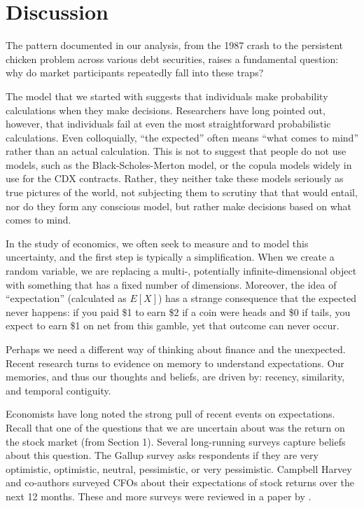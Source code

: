 
\section{Discussion}
The pattern documented in our analysis, from the 1987 crash to the persistent chicken problem across various debt securities, raises a fundamental question: why do market participants repeatedly fall into these traps?

The model that we started with suggests that individuals make probability calculations when they make decisions. Researchers have long pointed out, however, that individuals fail at even the most straightforward probabilistic calculations. Even colloquially, “the expected” often means “what comes to mind” rather than an actual calculation. This is not to suggest that people do not use models, such as the Black-Scholes-Merton model, or the copula models widely in use for the CDX contracts. Rather, they neither take these models seriously as true pictures of the world, not subjecting them to scrutiny that that would entail, nor do they form any conscious model, but rather make decisions based on what comes to mind. 

In the study of economics, we often seek to measure and to model this uncertainty, and the first step is typically a simplification. When we create a random variable, we are replacing a multi-, potentially infinite-dimensional object with something that has a fixed number of dimensions. Moreover, the idea of “expectation” (calculated as $E[X]$) has a strange consequence that the expected never happens: if you paid \$1 to earn \$2 if a coin were heads and \$0 if tails, you expect to earn \$1 on net from this gamble, yet that outcome can never occur. 

Perhaps we need a different way of thinking about finance and the unexpected. Recent research turns to evidence on memory to understand expectations. Our memories, and thus our thoughts and beliefs, are driven by: recency, similarity, and temporal contiguity.

Economists have long noted the strong pull of recent events on expectations. Recall that one of the questions that we are uncertain about was the return on the stock market (from Section 1). Several long-running surveys capture beliefs about this question. The Gallup survey asks respondents if they are very optimistic, optimistic, neutral, pessimistic, or very pessimistic. Campbell Harvey and co-authors surveyed CFOs about their expectations of stock returns over the next 12 months. These and more surveys were reviewed in a paper by \citet{greenwood2014expectations}.


